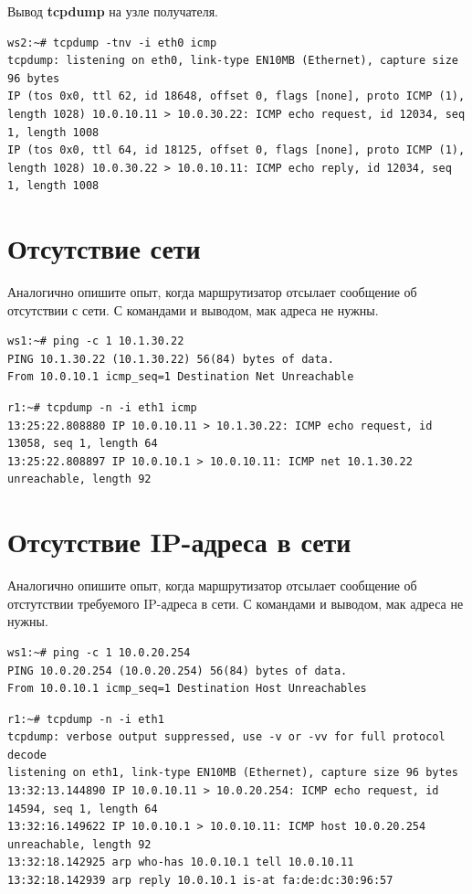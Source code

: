 \documentclass[a4paper,12pt]{article}
\begin{document}
Вывод \textbf{tcpdump} на узле получателя.

\begin{Verbatim}
ws2:~# tcpdump -tnv -i eth0 icmp
tcpdump: listening on eth0, link-type EN10MB (Ethernet), capture size 96 bytes
IP (tos 0x0, ttl 62, id 18648, offset 0, flags [none], proto ICMP (1), length 1028) 10.0.10.11 > 10.0.30.22: ICMP echo request, id 12034, seq 1, length 1008
IP (tos 0x0, ttl 64, id 18125, offset 0, flags [none], proto ICMP (1), length 1028) 10.0.30.22 > 10.0.10.11: ICMP echo reply, id 12034, seq 1, length 1008
\end{Verbatim}


\section{Отсутствие сети}

Аналогично опишите опыт, когда маршрутизатор отсылает сообщение об отсутствии с сети.
С командами и выводом, мак адреса не нужны.
\begin{Verbatim}
ws1:~# ping -c 1 10.1.30.22
PING 10.1.30.22 (10.1.30.22) 56(84) bytes of data.
From 10.0.10.1 icmp_seq=1 Destination Net Unreachable
\end{Verbatim}
\begin{Verbatim}
r1:~# tcpdump -n -i eth1 icmp 
13:25:22.808880 IP 10.0.10.11 > 10.1.30.22: ICMP echo request, id 13058, seq 1, length 64
13:25:22.808897 IP 10.0.10.1 > 10.0.10.11: ICMP net 10.1.30.22 unreachable, length 92
\end{Verbatim}
\section{Отсутствие IP-адреса в сети}

Аналогично опишите опыт, когда маршрутизатор отсылает сообщение об отстутствии требуемого IP-адреса в сети.
С командами и выводом, мак адреса не нужны.
\begin{Verbatim}
ws1:~# ping -c 1 10.0.20.254
PING 10.0.20.254 (10.0.20.254) 56(84) bytes of data.
From 10.0.10.1 icmp_seq=1 Destination Host Unreachables
\end{Verbatim}
\begin{Verbatim}
r1:~# tcpdump -n -i eth1 
tcpdump: verbose output suppressed, use -v or -vv for full protocol decode
listening on eth1, link-type EN10MB (Ethernet), capture size 96 bytes
13:32:13.144890 IP 10.0.10.11 > 10.0.20.254: ICMP echo request, id 14594, seq 1, length 64
13:32:16.149622 IP 10.0.10.1 > 10.0.10.11: ICMP host 10.0.20.254 unreachable, length 92
13:32:18.142925 arp who-has 10.0.10.1 tell 10.0.10.11
13:32:18.142939 arp reply 10.0.10.1 is-at fa:de:dc:30:96:57
\end{Verbatim}
\end{document}

